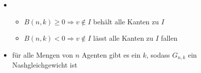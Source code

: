 \topbreak
	\vspace*{-1.5\baselineskip}
	\begin{itemize}
		\item[] \ \vspace*{-\baselineskip} 
			\begin{itemize}
				\item $B(n,k)\geq 0\Rightarrow v\notin I$ behält alle Kanten zu $I$
				\item $B(n,k) < 0 \Rightarrow v\notin I$ lässt alle Kanten zu $I$ fallen
			\end{itemize}
		\item für alle Mengen von $n$ Agenten gibt es ein $k$, sodass $G_{n,k}$ ein Nashgleichgewicht ist
	\end{itemize}